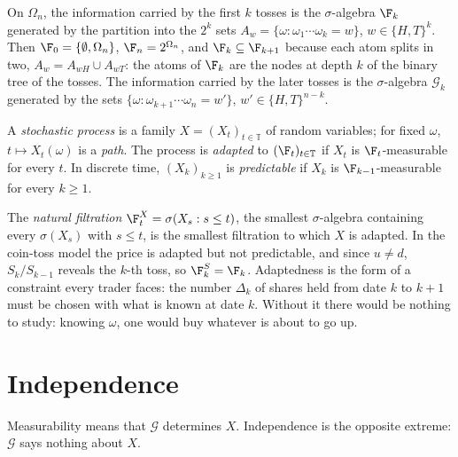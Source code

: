 \begin{example}\label{exa:pr-coin-filtration}
On $\Omega_n$, the information carried by the first $k$ tosses is the $\sigma$-algebra
$\F_k$ generated by the partition into the $2^k$ sets
$A_w=\{\omega:\omega_1\cdots\omega_k=w\}$, $w\in\{H,T\}^k$. Then $\F_0=\{\emptyset,\Omega_n\}$,
$\F_n=2^{\Omega_n}$, and $\F_k\subseteq\F_{k+1}$ because each atom splits in two,
$A_w=A_{wH}\cup A_{wT}$: the atoms of $\F_k$ are the nodes at depth $k$ of the binary tree of
the tosses. The information carried by the later tosses is the $\sigma$-algebra
$\mathcal G_k$ generated by the sets $\{\omega:\omega_{k+1}\cdots\omega_n=w'\}$,
$w'\in\{H,T\}^{n-k}$.
\end{example}

\begin{definition}\label{def:pr-adapted}
A \emph{stochastic process} is a family $X=(X_t)_{t\in\mathbb T}$ of random variables; for
fixed $\omega$, $t\mapsto X_t(\omega)$ is a \emph{path}. The process is \emph{adapted} to
$(\F_t)_{t\in\mathbb T}$ if $X_t$ is $\F_t$-measurable for every $t$. In discrete time,
$(X_k)_{k\ge1}$ is \emph{predictable} if $X_k$ is $\F_{k-1}$-measurable for every $k\ge1$.
\end{definition}

The \emph{natural filtration} $\F^X_t=\sigma(X_s:s\le t)$, the smallest $\sigma$-algebra
containing every $\sigma(X_s)$ with $s\le t$, is the smallest filtration to which $X$ is
adapted. In the coin-toss model the price is adapted but not predictable, and since
$u\ne d$, $S_k/S_{k-1}$ reveals the $k$-th toss, so $\F^S_k=\F_k$. Adaptedness is the form
of a constraint every trader faces: the number $\Delta_k$ of shares held from date $k$ to
$k+1$ must be chosen with what is known at date $k$. Without it there would be nothing to
study: knowing $\omega$, one would buy whatever is about to go up.

\section{Independence}\label{sec:pr-independence}

Measurability means that $\mathcal G$ determines $X$. Independence is the opposite
extreme: $\mathcal G$ says nothing about $X$.


